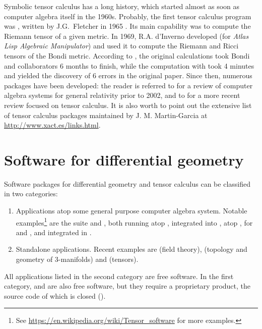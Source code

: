 Symbolic tensor calculus has a long history, which started
almost as soon as computer algebra itself in the 1960s.
Probably, the first tensor calculus program was , written by J.G.~Fletcher
in 1965 \cite{Fletc67}. Its main capability was to compute the Riemann tensor
of a given metric. In 1969, R.A. d'Inverno developed 
(for \emph{Atlas Lisp Algebraic Manipulator}) and used it to compute
the Riemann and Ricci tensors of the Bondi metric.
According to \cite{Skea94},
the original calculations took Bondi and collaborators 6 months to finish,
while the computation with  took 4 minutes and yielded the
discovery of 6 errors in the original paper.
Since then, numerous packages have been developed: the reader is referred to \cite{MacCa02}
for a review of computer algebra
systems for general relativity prior to 2002, and to \cite{KorolKS13} for a more recent review
focused on tensor calculus.
It is also worth to point out the extensive list of
tensor calculus packages maintained by J. M. Martin-Garcia at
\url{http://www.xact.es/links.html}.


\section{Software for differential geometry}

Software packages for differential geometry and tensor calculus can be
classified in two categories:
\begin{enumerate}
\item Applications atop some general purpose computer algebra system.
Notable examples\footnote{See \url{https://en.wikipedia.org/wiki/Tensor_software}
for more examples.} are
the  suite \cite{Marti08} and  \cite{ricci}, both
running atop ,
 \cite{AnderT12} integrated into ,
 \cite{grtensorIII} atop ,  \cite{atlas2}
for  and , and
 \cite{sagemanifolds} integrated in .
\item Standalone applications. Recent examples are 
\cite{Peete07} (field theory),
 \cite{snappy} (topology and geometry of 3-manifolds)  and
 \cite{BolotP13} (tensors).
\end{enumerate}
All applications listed in the second category are free software. In
the first category,  and  are also free software, but
they require a proprietary product, the source code of which is closed ().

